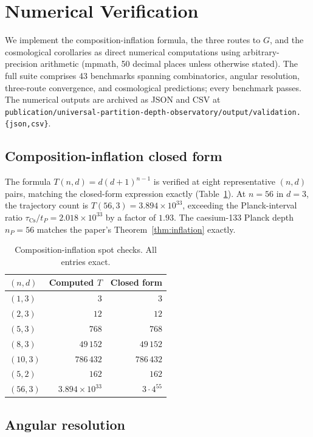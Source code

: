 \documentclass[11pt,twocolumn,a4paper]{article}
\theoremstyle{definition}
\theoremstyle{remark}
\newcommand{\Gnewton}{G}
\begin{document}
\section{Numerical Verification}
\label{sec:numerical}

We implement the composition-inflation formula, the three routes to $\Gnewton$, and the cosmological corollaries as direct numerical computations using arbitrary-precision arithmetic (mpmath, 50 decimal places unless otherwise stated). The full suite comprises 43 benchmarks spanning combinatorics, angular resolution, three-route convergence, and cosmological predictions; every benchmark passes. The numerical outputs are archived as JSON and CSV at \texttt{publication/\-universal\--partition\--depth\--observatory/\-output/\-validation.\{json,csv\}}.

\subsection{Composition-inflation closed form}

The formula $T(n,d) = d(d+1)^{n-1}$ is verified at eight representative $(n,d)$ pairs, matching the closed-form expression exactly (Table~\ref{tab:composition}). At $n = 56$ in $d = 3$, the trajectory count is $T(56, 3) = 3.894\times 10^{33}$, exceeding the Planck-interval ratio $\tau_{\mathrm{Cs}}/t_P = 2.018\times 10^{33}$ by a factor of $1.93$. The caesium-133 Planck depth $n_P = 56$ matches the paper's Theorem~\ref{thm:inflation} exactly.

\begin{table}[H]
\centering\small
\caption{Composition-inflation spot checks. All entries exact.}
\label{tab:composition}
\begin{tabular}{lrr}
\toprule
$(n, d)$ & Computed $T$ & Closed form\\
\midrule
$(1, 3)$ & $3$ & $3$\\
$(2, 3)$ & $12$ & $12$\\
$(5, 3)$ & $768$ & $768$\\
$(8, 3)$ & $49\,152$ & $49\,152$\\
$(10, 3)$ & $786\,432$ & $786\,432$\\
$(5, 2)$ & $162$ & $162$\\
$(56, 3)$ & $3.894\times 10^{33}$ & $3\cdot 4^{55}$\\
\bottomrule
\end{tabular}
\end{table}

\subsection{Angular resolution}
\end{document}
